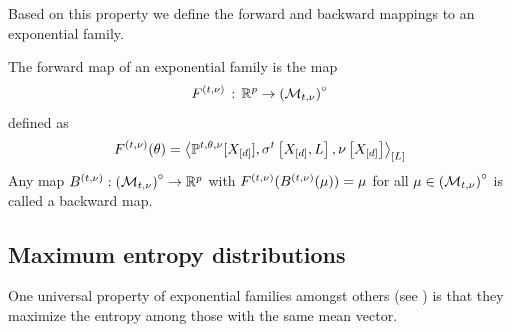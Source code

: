 Based on this property we define the forward and backward mappings to an exponential family.

\begin{definition}\label{def:forwardBackwardMapping}
    The forward map of an exponential family is the map
    \begin{align*}
        F^{(t,\nu)}  \,:\, \mathbb{R}^{p} \rightarrow {\left(\mathcal{M}_{t,\nu}\right)}^{\circ}
    \end{align*}
    defined as
    \begin{align*}
        F^{(t,\nu)}(\theta)
        = \left\langle \mathbb{P}^{t,\theta,\nu}[X_{[d]}],\sigma^{t}\left[X_{[d]},L\right],\nu\left[X_{[d]}\right]\right\rangle_{\left[ L \right]}
    \end{align*}
    Any map $B^{(t,\nu)}: {\left(\mathcal{M}_{t,\nu}\right)}^{\circ}\rightarrow \mathbb{R}^{p}$ with $F^{(t,\nu)}(B^{(t,\nu)}(\mu))=\mu$ for all $\mu\in{\left(\mathcal{M}_{t,\nu}\right)}^{\circ}$ is called a backward map.
\end{definition}

\subsection{Maximum entropy distributions}

One universal property of exponential families amongst others (see \cite{murphy_probabilistic_2023}) is that they maximize the entropy among those with the same mean vector.

